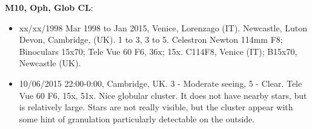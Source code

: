 {\bf M10, Oph, Glob CL}:
\begin{itemize}
\item xx/xx/1998 Mar 1998 to Jan 2015, Venice, Lorenzago (IT). Newcastle, Luton Devon, Cambridge, (UK). 1 to 3, 3 to 5. Celestron Newton 114mm F8; Binoculars 15x70; Tele Vue 60 F6, 36x; 15x. C114F8, Venice (IT); B15x70, Newcastle (UK).
\item 10/06/2015 22:00-0:00, Cambridge, UK. 3 - Moderate seeing, 5 - Clear. Tele Vue 60 F6, 15x, 51x. Nice globular cluster. It does not have nearby stars, but is relatively large. Stars are not really visible, but the cluster appear with some hint of granulation particularly detectable on the outside.
\end{itemize}
